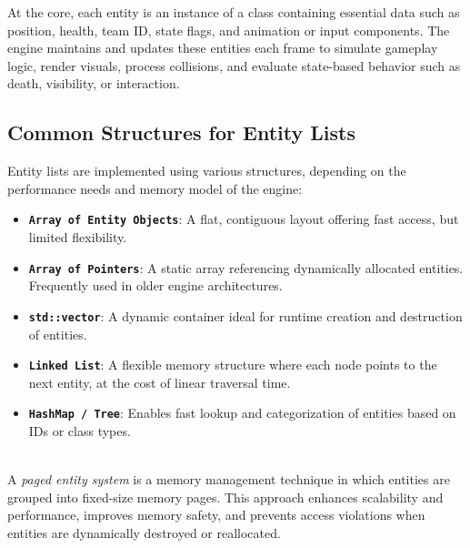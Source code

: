 At the core, each entity is an instance of a class containing essential data such as position, health, team ID, state flags, and animation or input components. The engine maintains and updates these entities each frame to simulate gameplay logic, render visuals, process collisions, and evaluate state-based behavior such as death, visibility, or interaction.

\subsection{Common Structures for Entity Lists}

Entity lists are implemented using various structures, depending on the performance needs and memory model of the engine:

\begin{itemize}[leftmargin=2em, itemsep=0em]
    \item \textbf{\texttt{Array of Entity Objects}}: A flat, contiguous layout offering fast access, but limited flexibility.

    \item \textbf{\texttt{Array of Pointers}}: A static array referencing dynamically allocated entities. Frequently used in older engine architectures.

    \item \textbf{\texttt{std::vector}}: A dynamic container ideal for runtime creation and destruction of entities.

    \item \textbf{\texttt{Linked List}}: A flexible memory structure where each node points to the next entity, at the cost of linear traversal time.

    \item \textbf{\texttt{HashMap / Tree}}: Enables fast lookup and categorization of entities based on IDs or class types.
\end{itemize}

\begin{tcolorbox}[colback=gray!10, colframe=gray!50, boxrule=0pt, sharp corners, width=\linewidth, left=1mm, right=1mm, top=0.5mm, bottom=0.5mm]
 \\
A \textit{paged entity system} is a memory management technique in which entities are grouped into fixed-size memory pages. This approach enhances scalability and performance, improves memory safety, and prevents access violations when entities are dynamically destroyed or reallocated.
\end{tcolorbox}

